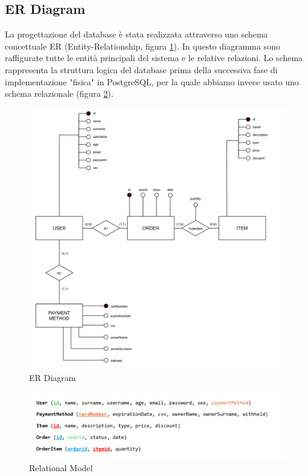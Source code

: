 \documentclass{article}
\begin{document}
\subsection{ER Diagram}
La progettazione del database è stata realizzata attraverso uno schema concettuale ER (Entity-Relationship, figura \ref{er}). In questo diagramma sono raffigurate tutte le entità principali del sistema e le relative relazioni. Lo schema rappresenta la struttura logica del database prima della successiva fase di implementazione "fisica" in PostgreSQL, per la quale abbiamo invece usato uno schema relazionale (figura \ref{RelationalModel}).

\vspace{1cm}

\begin{figure}[h]
    \centering
    \includegraphics[width=1\linewidth]{imgs/ER_m.png}
    \caption{ER Diagram}
    \label{er}
\end{figure}

\begin{figure}
    \centering
    \includegraphics[width=1.0\linewidth]{imgs/RelationalModel.png}
    \caption{Relational Model}
    \label{RelationalModel}
\end{figure}
\end{document}
